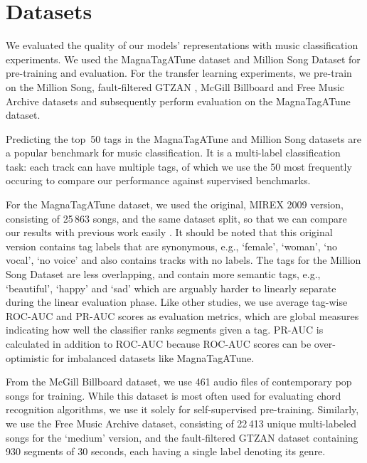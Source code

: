 \chapter{Datasets}


We evaluated the quality of our models' representations with music classification experiments.
We used the MagnaTagATune \cite{law2009evaluation} dataset and Million Song Dataset \cite{Bertin-Mahieux2011} for pre-training and evaluation.
For the transfer learning experiments, we pre-train on the Million Song, fault-filtered GTZAN \cite{tzanetakis2002musical,sturm2013gtzan}, McGill Billboard \cite{burgoyne_billboard} and Free Music Archive \cite{fma_dataset} datasets and subsequently perform evaluation on the MagnaTagATune dataset.


Predicting the top~50 tags in the Magna\-Tag\-A\-Tune and Million Song datasets are a popular benchmark for music classification.
It is a multi-label classification task: each track can have multiple tags, of which we use the 50 most frequently occuring to compare our performance against supervised benchmarks.

For the Magna\-Tag\-A\-Tune dataset, we used the original, MIREX 2009 version, consisting of 25\,863 songs, and the same dataset split, so that we can compare our results with previous work easily \cite{pons_end--end_2017, lee2018samplecnn, dieleman_feature_learning}.
It should be noted that this original version contains tag labels that are synonymous, e.g., `female', `woman', `no vocal', `no voice' and also contains tracks with no labels.
The tags for the Million Song Dataset are less overlapping, and contain more semantic tags, e.g., `beautiful', `happy' and `sad' which are arguably harder to linearly separate during the linear evaluation phase.
Like other studies, we use average tag-wise ROC-AUC and PR-AUC scores as evaluation metrics, which are global measures indicating how well the classifier ranks segments given a tag.
PR-AUC is calculated in addition to ROC-AUC because ROC-AUC scores can be over-optimistic for imbalanced datasets like Magna\-Tag\-A\-Tune\cite{pons_end--end_2017}.


From the McGill Billboard dataset, we use 461 audio files of contemporary pop songs for training.
While this dataset is most often used for evaluating chord recognition algorithms, we use it solely for self-supervised pre-training.
Similarly, we use the Free Music Archive dataset, consisting of 22\,413 unique multi-labeled songs for the `medium' version, and the fault-filtered GTZAN dataset containing 930 segments of 30 seconds, each having a single label denoting its genre.


